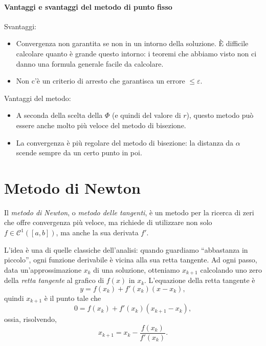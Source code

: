 \documentclass[a4paper]{report}
\theoremstyle{definition}
\theoremstyle{remark}
\begin{document}


\paragraph{Vantaggi e svantaggi del metodo di punto fisso}

Svantaggi:
\begin{itemize}
    \item Convergenza non garantita se non in un intorno della soluzione. È difficile calcolare quanto è grande questo intorno: i teoremi che abbiamo visto non ci danno una formula generale facile da calcolare.
    \item Non c'è un criterio di arresto che garantisca un errore $\leq \varepsilon$.
\end{itemize}
Vantaggi del metodo:
\begin{itemize}
    \item A seconda della scelta della $\Phi$ (e quindi del valore di $r$), questo metodo può essere anche molto più veloce del metodo di bisezione.
    \item La convergenza è più regolare del metodo di bisezione: la distanza da $\alpha$ scende sempre da un certo punto in poi. 
\end{itemize}


\section{Metodo di Newton}

Il \emph{metodo di Newton}, o \emph{metodo delle tangenti}, è un metodo per la ricerca di zeri che offre convergenza più veloce, ma richiede di utilizzare non solo $f \in \mathcal{C}^1([a,b])$, ma anche la sua derivata $f'$.

L'idea è una di quelle classiche dell'analisi: quando guardiamo ``abbastanza in piccolo'', ogni funzione derivabile è vicina alla sua retta tangente. Ad ogni passo, data un'approssimazione $x_k$ di una soluzione, otteniamo $x_{k+1}$ calcolando uno zero della \emph{retta tangente} al grafico di $f(x)$ in $x_k$. L'equazione della retta tangente è
\[
y = f(x_k) + f'(x_k) (x- x_k),
\]
quindi $x_{k+1}$ è il punto tale che
\[
0 = f(x_k) + f'(x_k) (x_{k+1}- x_k),
\]
ossia, risolvendo,
\[
x_{k+1} = x_k - \frac{f(x_k)}{f'(x_k)}.
\]
\end{document}
